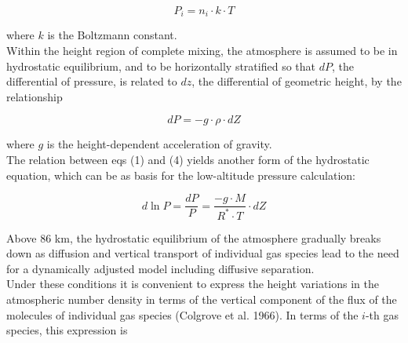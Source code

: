 \documentclass{article}
\begin{document}
\begin{equation}
    P_i = n_i \cdot k \cdot T \tag{3}
\end{equation}

where $k$ is the Boltzmann constant. \\

Within the height region of complete mixing, the atmosphere is assumed to be in hydrostatic equilibrium, and to be horizontally stratified so that $dP$, the differential of pressure, is related to $dz$, the differential of geometric height, by the relationship

\begin{equation}
    dP = -g \cdot \rho \cdot dZ \tag{4}
\end{equation}

where $g$ is the height-dependent acceleration of gravity. \\
The relation between eqs (1) and (4) yields another form of the hydrostatic equation, which can be as basis for the low-altitude pressure calculation:

\begin{equation}
d \ln P = \frac{dP}{P} = \frac{-g \cdot M}{R^* \cdot T} \cdot dZ \tag{5}
\end{equation}

Above 86 km, the hydrostatic equilibrium of the atmosphere gradually breaks down as diffusion and vertical transport of individual gas species lead to the need for a dynamically adjusted model including diffusive separation. \\
Under these conditions it is convenient to express the height variations in the atmospheric number density in terms of the vertical component of the flux of the molecules of individual gas species (Colgrove et al. 1966). In terms of the $i$-th gas species, this expression is
\end{document}
